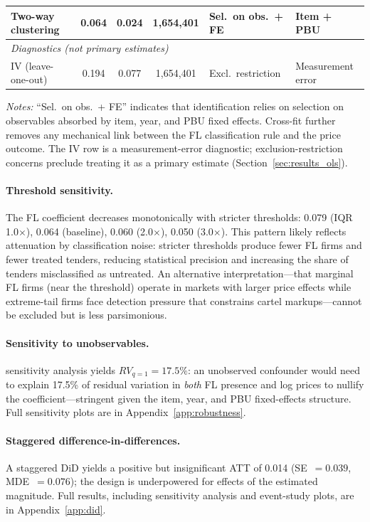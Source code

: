 \begin{table}[htbp]
\begin{tabular}{lcccll}
Two-way clustering & 0.064 & 0.024 & 1{,}654{,}401 & Sel.\ on obs.\ + FE & Item + PBU \\
\hline
\multicolumn{6}{l}{\textit{Diagnostics (not primary estimates)}} \\
IV (leave-one-out) & 0.194 & 0.077 & 1{,}654{,}401 & Excl.\ restriction & Measurement error \\
\hline\hline
\end{tabular}
\begin{tablenotes}
\small
\item \textit{Notes:} ``Sel.\ on obs.\ + FE'' indicates that identification relies on selection on observables absorbed by item, year, and PBU fixed effects. Cross-fit further removes any mechanical link between the FL classification rule and the price outcome. The IV row is a measurement-error diagnostic; exclusion-restriction concerns preclude treating it as a primary estimate (Section~\ref{sec:results_ols}).
\end{tablenotes}
\end{table}


\paragraph{Threshold sensitivity.}
The FL coefficient decreases monotonically with stricter thresholds:
0.079 (IQR 1.0$\times$), 0.064 (baseline), 0.060 (2.0$\times$),
0.050 (3.0$\times$). This pattern likely reflects attenuation by
classification noise: stricter thresholds produce fewer FL firms and
fewer treated tenders, reducing statistical precision and increasing
the share of tenders misclassified as untreated. An alternative
interpretation---that marginal FL firms (near the threshold) operate
in markets with larger price effects while extreme-tail firms face
detection pressure that constrains cartel markups---cannot be excluded
but is less parsimonious.

\paragraph{Sensitivity to unobservables.}
\citet{cinelli2020making} sensitivity analysis yields $RV_{q=1} =
17.5\%$: an unobserved confounder would need to explain 17.5\% of
residual variation in \emph{both} FL presence and log prices to nullify
the coefficient---stringent given the item, year, and PBU fixed-effects
structure. Full sensitivity plots are in
Appendix~\ref{app:robustness}.


\paragraph{Staggered difference-in-differences.}
A \citet{callaway2021difference} staggered DiD yields a positive but
insignificant ATT of 0.014 (SE~$= 0.039$, MDE~$= 0.076$); the design
is underpowered for effects of the estimated magnitude. Full results,
including \citet{rambachan2023more} sensitivity analysis and
event-study plots, are in Appendix~\ref{app:did}.


